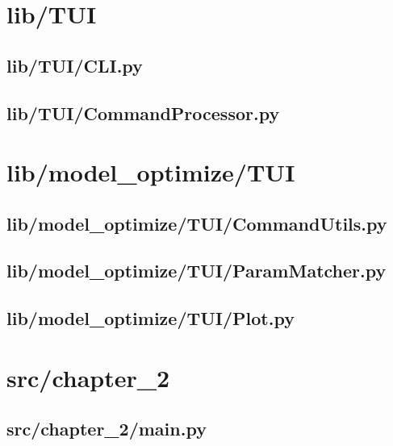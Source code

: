 \section{lib/TUI}

\subsection*{lib/TUI/CLI.py}
\label{ap:CLI}

\subsection*{lib/TUI/CommandProcessor.py}
\label{ap:CommandProcessor}
\section{lib/model\_optimize/TUI}

\subsection*{lib/model\_optimize/TUI/CommandUtils.py}
\label{ap:CommandUtils}

\subsection*{lib/model\_optimize/TUI/ParamMatcher.py}
\label{ap:ParamMatcher}

\subsection*{lib/model\_optimize/TUI/Plot.py}
\label{ap:Plot}
\section{src/chapter\_2}

\subsection*{src/chapter\_2/main.py}
\label{ap:main}

